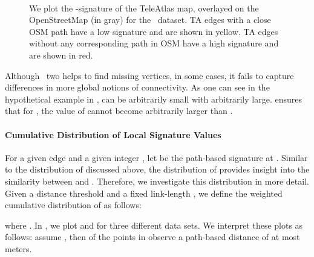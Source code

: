 \addtocounter{footnote}{-1}
\begin{figure}[t!p!]
\centering {}\ \ \
\caption{We plot the -signature of the TeleAtlas map, overlayed on
the OpenStreetMap (in
gray) for the \bsmall\ dataset\footnotemark.  
TA edges with a close OSM path have a low signature and
are shown in yellow.
TA edges without any corresponding path in OSM have a high signature and are 
shown in red.
}
\label{fig-lengthone}
\end{figure}



Although \length\ two helps to find missing vertices, in some cases,
it fails to capture differences in more global notions of connectivity.
As one can see in the hypothetical example in
,  can be arbitrarily small with 
arbitrarily large.   ensures that for , the
value of  cannot become arbitrarily larger than .







\paragraph{Cumulative Distribution of Local Signature Values}
For a given edge  and a given integer , let
 be the
path-based signature at . Similar to the distribution of 
discussed above, the distribution of  provides insight
into the similarity between  and .  Therefore, we investigate this
distribution in more detail.
Given a distance threshold  and a fixed link-length , we define the
weighted cumulative distribution of
 as follows:

where .  In , we plot
 and  for
three different data sets.  We interpret these plots as follows: assume
, then  of the points in
 observe a path-based distance of at most  meters.






